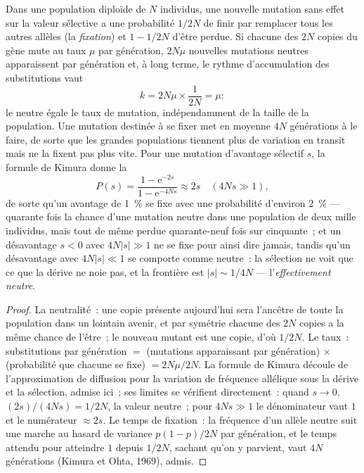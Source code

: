 \begin{theorem}\label{thm:b3:molecular-evolution:neutral}
Dans une population diploïde de $N$ individus, une nouvelle mutation
sans effet sur la valeur sélective a une probabilité $1/2N$ de finir par
remplacer tous les autres allèles (la \emph{fixation}) et $1 - 1/2N$
d'être perdue. Si chacune des $2N$ copies du gène mute au taux $\mu$ par
génération, $2N\mu$ nouvelles mutations neutres apparaissent par
génération et, à long terme, le rythme d'accumulation des substitutions
vaut
\[
k = 2N\mu\times\frac{1}{2N} = \mu :
\]
le \emph{} neutre égale le taux de mutation,
indépendamment de la taille de la population. Une mutation destinée à se
fixer met en moyenne $4N$ générations à le faire, de sorte que les
grandes populations tiennent plus de variation en transit mais ne la
fixent pas plus vite. Pour une mutation d'avantage sélectif $s$, la
formule de Kimura donne la 
\[
P(s) = \frac{1 - \mathrm{e}^{-2s}}{1 - \mathrm{e}^{-4Ns}} \approx 2s
\quad (4Ns \gg 1),
\]
de sorte qu'un avantage de \qty{1}{\%} se fixe avec une probabilité
d'environ \qty{2}{\%} --- quarante fois la chance d'une mutation neutre
dans une population de deux mille individus, mais tout de même perdue
quarante-neuf fois sur cinquante~; et un désavantage $s < 0$ avec
$4N|s| \gg 1$ ne se fixe pour ainsi dire jamais, tandis qu'un
désavantage avec $4N|s| \ll 1$ se comporte comme neutre~: la sélection
ne voit que ce que la dérive ne noie pas, et la frontière est $|s| \sim
1/4N$ --- l'\emph{effectivement neutre}.
\end{theorem}
\begin{proof}
La neutralité~: une copie présente aujourd'hui sera l'ancêtre de toute
la population dans un lointain avenir, et par symétrie chacune des $2N$
copies a la même chance de l'être~; le nouveau mutant est une copie,
d'où $1/2N$. Le taux~: substitutions par génération $=$ (mutations
apparaissant par génération) $\times$ (probabilité que chacune se fixe)
$= 2N\mu/2N$. La formule de Kimura découle de l'approximation de
diffusion pour la variation de fréquence allélique sous la dérive et la
sélection, admise ici~; ses limites se vérifient directement~: quand
$s \to 0$, $(2s)/(4Ns) = 1/2N$, la valeur neutre~; pour $4Ns \gg 1$ le
dénominateur vaut $1$ et le numérateur $\approx 2s$. Le temps de
fixation~: la fréquence d'un allèle neutre suit une marche au hasard de
variance $p(1-p)/2N$ par génération, et le temps attendu pour atteindre
$1$ depuis $1/2N$, sachant qu'on y parvient, vaut $4N$ générations
(Kimura et Ohta, 1969), admis.
\end{proof}


